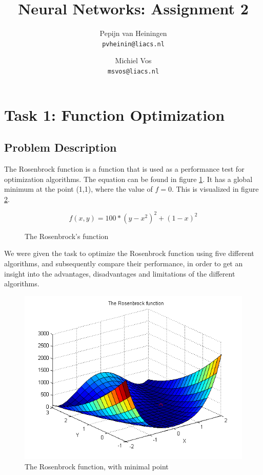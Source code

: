 \documentclass{article}
\title{Neural Networks: Assignment 2}
\author{Pepijn van Heiningen \\ \texttt{pvheinin@liacs.nl} \and Michiel Vos \\ \texttt{msvos@liacs.nl}}
\begin{document}
\maketitle

\section{Task 1: Function Optimization}
\subsection{Problem Description}
The Rosenbrock function is a function that is used as a performance test for optimization algorithms. The equation can be found in figure \ref{eq:rosen}. It has a global minimum at the point (1,1), where the value of $f = 0$. This is visualized in figure \ref{fig:rosenbrock}. \\

\begin{figure}[H]
\[f(x,y) = 100 * (y-x^2)^2 + (1 - x)^2\]
\caption{The Rosenbrock's function}
\label{eq:rosen}
\end{figure}

We were given the task to optimize the Rosenbrock function using five different algorithms, and subsequently compare their performance, in order to get an insight into the advantages, disadvantages and limitations of the different algorithms.\\

\begin{figure}[H]
	\centering
		\includegraphics[scale=0.8]{rosenbrock.png}
	\caption{The Rosenbrock function, with minimal point}
	\label{fig:rosenbrock}
\end{figure}
\end{document}
